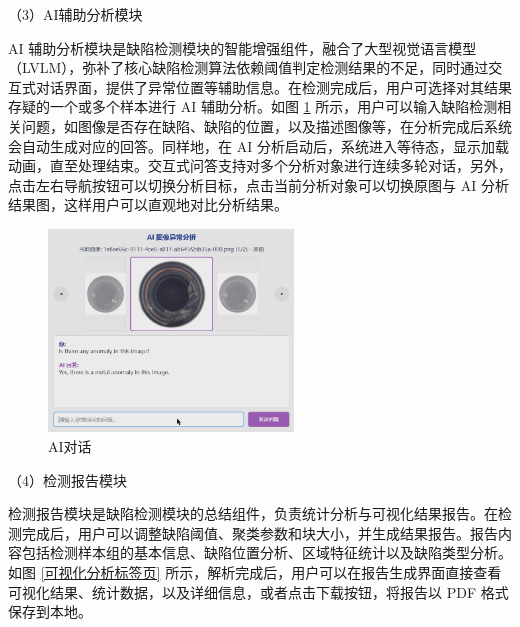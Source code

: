 \documentclass[
  ]{njuthesis}
\begin{document}
（3）AI辅助分析模块

AI 辅助分析模块是缺陷检测模块的智能增强组件，融合了大型视觉语言模型（LVLM），弥补了核心缺陷检测算法依赖阈值判定检测结果的不足，同时通过交互式对话界面，提供了异常位置等辅助信息。在检测完成后，用户可选择对其结果存疑的一个或多个样本进行 AI 辅助分析。如图 \ref{AI对话} 所示，用户可以输入缺陷检测相关问题，如图像是否存在缺陷、缺陷的位置，以及描述图像等，在分析完成后系统会自动生成对应的回答。同样地，在 AI 分析启动后，系统进入等待态，显示加载动画，直至处理结束。交互式问答支持对多个分析对象进行连续多轮对话，另外，点击左右导航按钮可以切换分析目标，点击当前分析对象可以切换原图与 AI 分析结果图，这样用户可以直观地对比分析结果。

\begin{figure}[H]
    \centering
    \includegraphics[width=0.58\textwidth]{images/AI对话.png}
    \caption{AI对话}
    \label{AI对话}
\end{figure}

（4）检测报告模块

检测报告模块是缺陷检测模块的总结组件，负责统计分析与可视化结果报告。在检测完成后，用户可以调整缺陷阈值、聚类参数和块大小，并生成结果报告。报告内容包括检测样本组的基本信息、缺陷位置分析、区域特征统计以及缺陷类型分析。如图 \ref{可视化分析标签页} 所示，解析完成后，用户可以在报告生成界面直接查看可视化结果、统计数据，以及详细信息，或者点击下载按钮，将报告以 PDF 格式保存到本地。
\end{document}
